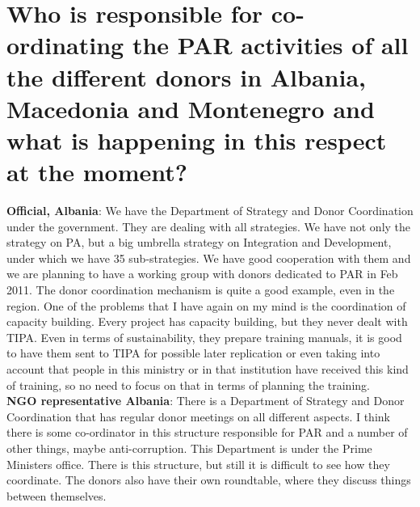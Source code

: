 \section{Who is responsible for co-ordinating the PAR activities of all the different donors in Albania, Macedonia and Montenegro and what is happening in this respect at the moment? }
\textbf{Official, Albania}: We have the Department of Strategy and Donor Coordination under the government. They are dealing with all strategies. We have not only the strategy on PA, but a big umbrella strategy on Integration and Development, under which we have 35 sub-strategies. We have good cooperation with them and we are planning to have a working group with donors dedicated to PAR in Feb 2011. The donor coordination mechanism is quite a good example, even in the region. One of the problems that I have again on my mind is the coordination of capacity building. Every project has capacity building, but they never dealt with TIPA. Even in terms of sustainability, they prepare training manuals, it is good to have them sent to TIPA for possible later replication or even taking into account that people in this ministry or in that institution have received this kind of training, so no need to focus on that in terms of planning the training. \\
\textbf{NGO representative Albania}: There is a Department of Strategy and Donor Coordination that has regular donor meetings on all different aspects. I think there is some co-ordinator in this structure responsible for PAR and a number of other things, maybe anti-corruption. This Department is under the Prime Ministers office. There is this structure, but still it is difficult to see how they coordinate. The donors also have their own roundtable, where they discuss things between themselves.  \\
